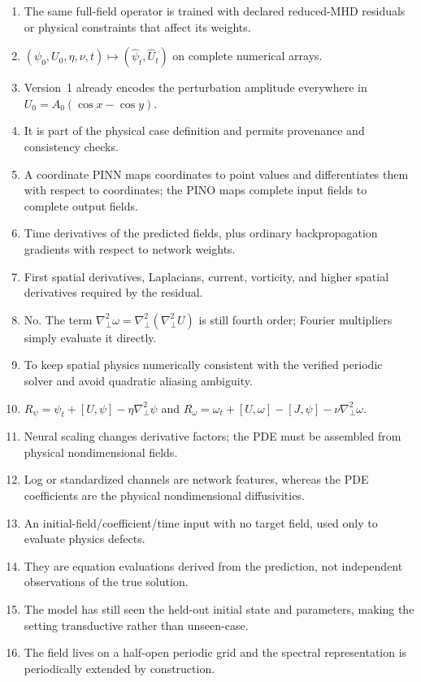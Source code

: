 \documentclass[11pt]{article}
\newcommand{\Lap}{\nabla_\perp^2}
\begin{document}
\begin{enumerate}[label=\textbf{A\arabic*.}]
  \item The same full-field operator is trained with declared reduced-MHD residuals or physical constraints that affect its weights.
  \item $(\psi_0,U_0,\eta,\nu,t)\mapsto(\widehat\psi_t,\widehat U_t)$ on complete numerical arrays.
  \item Version~1 already encodes the perturbation amplitude everywhere in $U_0=A_0(\cos x-\cos y)$.
  \item It is part of the physical case definition and permits provenance and consistency checks.
  \item A coordinate PINN maps coordinates to point values and differentiates them with respect to coordinates; the PINO maps complete input fields to complete output fields.
  \item Time derivatives of the predicted fields, plus ordinary backpropagation gradients with respect to network weights.
  \item First spatial derivatives, Laplacians, current, vorticity, and higher spatial derivatives required by the residual.
  \item No. The term $\Lap\omega=\Lap(\Lap U)$ is still fourth order; Fourier multipliers simply evaluate it directly.
  \item To keep spatial physics numerically consistent with the verified periodic solver and avoid quadratic aliasing ambiguity.
  \item $R_\psi=\psi_t+[U,\psi]-\eta\Lap\psi$ and $R_\omega=\omega_t+[U,\omega]-[J,\psi]-\nu\Lap\omega$.
  \item Neural scaling changes derivative factors; the PDE must be assembled from physical nondimensional fields.
  \item Log or standardized channels are network features, whereas the PDE coefficients are the physical nondimensional diffusivities.
  \item An initial-field/coefficient/time input with no target field, used only to evaluate physics defects.
  \item They are equation evaluations derived from the prediction, not independent observations of the true solution.
  \item The model has still seen the held-out initial state and parameters, making the setting transductive rather than unseen-case.
  \item The field lives on a half-open periodic grid and the spectral representation is periodically extended by construction.

\end{enumerate}
\end{document}
